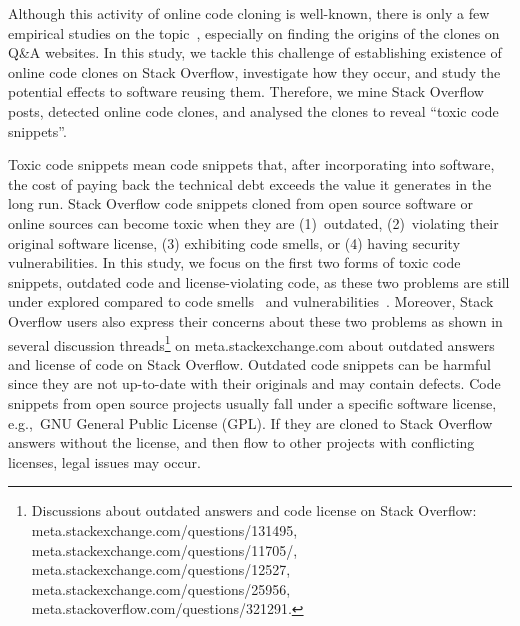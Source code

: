 \documentclass[10pt,journal,compsoc]{IEEEtran}
\begin{document}
Although this activity of online code cloning is well-known, there is only a few
empirical studies on the topic~\cite{An2017,Abdalkareem2017,Baltes2017}, especially
on finding the origins of the clones on Q\&A websites.
In this study, we tackle this challenge of establishing existence of online code 
clones on Stack Overflow, investigate how they occur, and study the potential
effects to software reusing them.
Therefore, we mine Stack Overflow posts, detected online code clones, and analysed the clones to reveal
``toxic code snippets''.

Toxic code snippets mean code snippets that, after incorporating into software,
the cost of paying back the technical debt exceeds the value it generates in the long run.
Stack Overflow code snippets
cloned from open source software or online sources can become toxic when they
are (1)~outdated, (2)~violating their original software
license, (3) exhibiting code smells, or (4) having security vulnerabilities. 
In this study, we focus on the first two forms of toxic code snippets, outdated code and license-violating code,
as these two problems are still under explored compared to code smells~\cite{Tufano2015} and vulnerabilities~\cite{Acar2016,Fischer2017}.
Moreover, Stack Overflow users also express their concerns about these two problems
as shown in several discussion threads\footnote{Discussions about outdated answers and code license on
	Stack Overflow: meta.stackexchange.com/questions/131495, 
	meta.stackexchange.com/questions/11705/, meta.stackexchange.com/questions/12527,
	meta.stackexchange.com/questions/25956, meta.stackoverflow.com/questions/321291.}
	 on \textsf{meta.stackexchange.com} about outdated
answers and license of code on Stack Overflow.
Outdated code snippets can be harmful since they are not up-to-date with their originals and may
contain defects. Code snippets from open source projects usually fall under a
specific software license, e.g.,\ GNU General Public License (GPL). If they are
cloned to Stack Overflow answers without the license, and then flow to other projects
with conflicting licenses, legal issues may occur.
\end{document}
